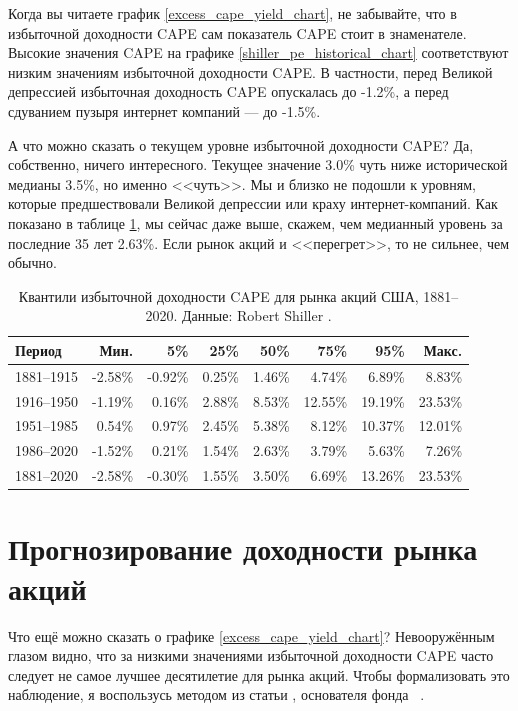 Когда вы читаете график \ref{excess_cape_yield_chart}, не забывайте, что в избыточной доходности CAPE сам показатель CAPE стоит в знаменателе. Высокие значения CAPE на графике \ref{shiller_pe_historical_chart} соответствуют низким значениям избыточной доходности CAPE. В частности, перед Великой депрессией избыточная доходность CAPE опускалась до -1.2\%, а перед сдуванием пузыря интернет компаний --- до -1.5\%.

А что можно сказать о текущем уровне избыточной доходности CAPE? Да, собственно, ничего интересного. Текущее значение 3.0\% чуть ниже исторической медианы 3.5\%, но именно <<чуть>>. Мы и близко не подошли к уровням, которые предшествовали Великой депрессии или краху интернет-компаний. Как показано в таблице \ref{cape_excess_yield_quantiles_table}, мы сейчас даже выше, скажем,  чем медианный уровень за последние 35 лет 2.63\%. Если рынок акций и <<перегрет>>, то не сильнее, чем обычно.

\begin{table}[ht]
\centering
\begin{tabular}{l|r|r|r|r|r|r|r}
Период       & Мин.      & 5\%       & 25\%   & 50\%    & 75\%      & 95\% & Макс. \\ \hline
1881--1915 & -2.58\% & -0.92\% & 0.25\% & 1.46\% &   4.74\% & 6.89\%  & 8.83\% \\
1916--1950 & -1.19\% &  0.16\% & 2.88\% & 8.53\% & 12.55\%  & 19.19\% & 23.53\% \\
1951--1985 &  0.54\% &  0.97\% & 2.45\% & 5.38\% &   8.12\%  & 10.37\% & 12.01\% \\
1986--2020 & -1.52\% &  0.21\% & 1.54\% & 2.63\% &   3.79\%  & 5.63\%  & 7.26\% \\ \hline
1881--2020 & -2.58\% & -0.30\% & 1.55\% & 3.50\% &   6.69\%  & 13.26\% & 23.53\%
\end{tabular}
\caption{Квантили избыточной доходности CAPE для рынка акций США, 1881--2020. Данные: Robert Shiller \cite{shillerOnline}.}
\label{cape_excess_yield_quantiles_table}
\end{table}

\section*{Прогнозирование доходности рынка акций}

Что ещё можно сказать о графике \ref{excess_cape_yield_chart}? Невооружённым глазом видно, что за низкими значениями избыточной доходности CAPE часто следует не самое лучшее десятилетие для рынка акций. Чтобы формализовать это наблюдение, я воспользусь методом из статьи , основателя фонда \ \cite{asness2012old}.

